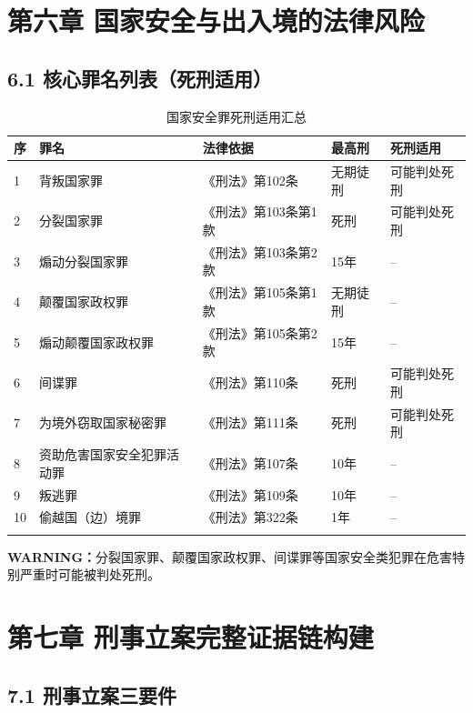 \documentclass[12pt,a4paper]{article}
\begin{document}
\clearpage

\section{第六章 国家安全与出入境的法律风险}

\subsection{6.1 核心罪名列表（死刑适用）}

\begin{longtable}{p{0.5cm}p{5cm}p{3cm}p{2cm}p{2cm}}
  \toprule
  \textbf{序} & \textbf{罪名} & \textbf{法律依据} & \textbf{最高刑} & \textbf{死刑适用} \\
  \midrule
  1 & 背叛国家罪 & 《刑法》第102条 & 无期徒刑 & 可能判处死刑 \\
  2 & 分裂国家罪 & 《刑法》第103条第1款 & 死刑 & 可能判处死刑 \\
  3 & 煽动分裂国家罪 & 《刑法》第103条第2款 & 15年 & -- \\
  4 & 颠覆国家政权罪 & 《刑法》第105条第1款 & 无期徒刑 & -- \\
  5 & 煽动颠覆国家政权罪 & 《刑法》第105条第2款 & 15年 & -- \\
  6 & 间谍罪 & 《刑法》第110条 & 死刑 & 可能判处死刑 \\
  7 & 为境外窃取国家秘密罪 & 《刑法》第111条 & 死刑 & 可能判处死刑 \\
  8 & 资助危害国家安全犯罪活动罪 & 《刑法》第107条 & 10年 & -- \\
  9 & 叛逃罪 & 《刑法》第109条 & 10年 & -- \\
  10 & 偷越国（边）境罪 & 《刑法》第322条 & 1年 & -- \\
  \bottomrule
  \caption{国家安全罪死刑适用汇总}
\end{longtable}

\textbf{WARNING：}分裂国家罪、颠覆国家政权罪、间谍罪等国家安全类犯罪在危害特别严重时可能被判处死刑。

\clearpage

\section{第七章 刑事立案完整证据链构建}

\subsection{7.1 刑事立案三要件}
\end{document}
